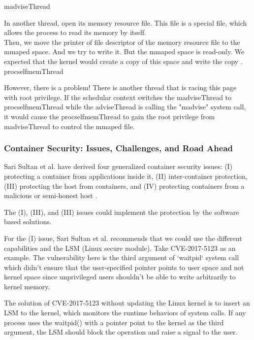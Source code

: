 \documentclass[12pt,a4paper]{article}
\begin{document}
\hypertarget{madvise}{madviseThread}


In another thread, open its memory resource file. This file is a special file, which allows
the process to read its memory by itself.\\

Then, we move the printer of file descriptor of the memory resource file to the mmaped
space. And we try to write it. But the mmaped space is read-only. We expected that the
kernel would create a copy of this space and write the copy \cite{root_exploit}.\\
\hypertarget{procself}{procselfmemThread}


However, there is a problem! There is another thread that is racing this page with root
privilege. If the schedular context switches the madviseThread to procselfmemThread while
the adviseThread is calling the "madvise" system call, it would cause the
procselfmemThread to gain the root privilege from madviseThread to control the mmaped file.

\subsubsection{Container Security: Issues, Challenges, and Road Ahead}
Sari Sultan et al. \cite{Road_Ahead} have derived four generalized container security issues:
(\RN{1}) protecting a container from applications inside it, (\RN{2}) inter-container
protection, (\RN{3}) protecting the host from containers, and (\RN{4}) protecting containers
from a malicious or semi-honest host \cite{Road_Ahead}.

The (\RN{1}), (\RN{3}), and (\RN{3}) issues could implement the protection by the software
based solutions.

For the (\RN{1}) issue, Sari Sultan et al. \cite{Road_Ahead} recommends that
we could use the different capabilities and the LSM (Linux secure module). Take
CVE-2017-5123 \cite{CVE-2017-5123} as an example. The vulnerability here is the third argument of
`waitpid` system call which didn't ensure that the user-specified pointer points to user space
and not kernel space since unprivileged users shouldn’t be able to write arbitrarily
to kernel memory.

The solution of CVE-2017-5123 without updating the Linux kernel is to insert an
LSM to the kernel, which monitors the runtime behaviors of system calls. If any process
uses the waitpid() with a pointer point to the kernel as the third argument, the LSM should
block the operation and raise a signal to the user.
\end{document}

